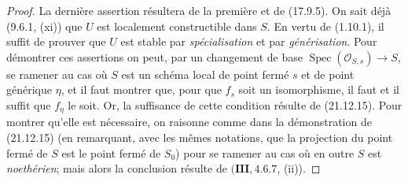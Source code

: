 \begin{proof}
La dernière assertion résultera de la première et de (17.9.5). On sait déjà (9.6.1,
(xi)) que $U$ est localement constructible dans $S$. En vertu de (1.10.1), il suffit de
prouver que $U$ est stable par \emph{spécialisation} et par \emph{générisation}. Pour
démontrer ces assertions on
peut, par un changement de base $\operatorname{Spec}(\mathcal O_{S,s})\to S$, se
ramener au cas où $S$ est un schéma local de point fermé $s$ et de point générique
$\eta$, et il faut montrer que, pour que $f_s$ soit un isomorphisme, il faut et il suffit
que $f_\eta$ le soit. Or, la suffisance de cette condition résulte de (21.12.15). Pour
montrer qu'elle est nécessaire, on raisonne comme dans la démonstration de (21.12.15)
(en remarquant, avec les mêmes notations, que la projection du point fermé de $S$ est le
point fermé de $S_0$) pour se ramener au cas où en outre $S$ est \emph{noethérien};
mais alors la conclusion résulte de $(\mathbf{III}, 4.6.7$, (ii)).
\end{proof}

